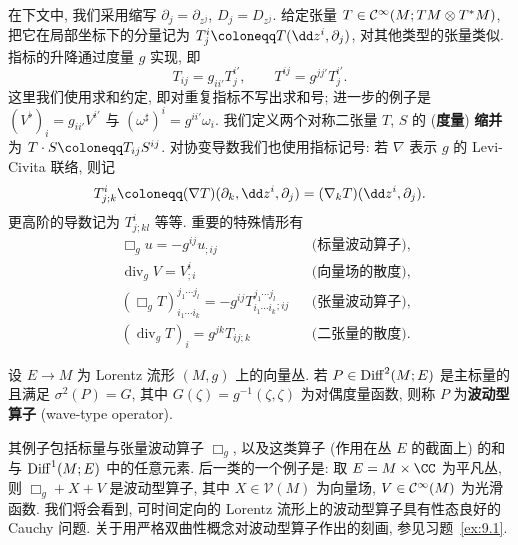 在下文中, 我们采用缩写 $\partial_j = \partial_{z^j}$, $D_j = D_{z^j}$. 给定张量 $T \in \mathcal{C}^\infty(M; TM \otimes T^* M)$, 把它在局部坐标下的分量记为 $T^i_j \defeq T(\dd z^i, \partial_j)$, 对其他类型的张量类似. 指标的升降通过度量 $g$ 实现, 即
\begin{equation}\label{eq:9.8}
    T_{ij} = g_{ii'} T^{i'}_j, \qquad T^{ij} = g^{jj'} T^{i'}_j.
\end{equation}
这里我们使用求和约定, 即对重复指标不写出求和号; 进一步的例子是 $(V^\flat)_i = g_{ii'} V^{i'}$ 与 $(\omega^\sharp)^i = g^{ii'} \omega_i$. 我们定义两个对称二张量 $T$, $S$ 的 (\textbf{度量}) \textbf{缩并}为 $T \cdot S \defeq T_{ij} S^{ij}$. 对协变导数我们也使用指标记号: 若 $\nabla$ 表示 $g$ 的 Levi-Civita 联络, 则记
\begin{equation}\label{eq:9.9}
    T^i_{j;k} \defeq (\nabla T)(\partial_k, \dd z^i, \partial_j) = (\nabla_k T)(\dd z^i, \partial_j).
\end{equation}
更高阶的导数记为 $T^i_{j;kl}$ 等等. 重要的特殊情形有
\begin{equation}\label{eq:9.10}
    \begin{aligned}
        &\Box_g u = -g^{ij} u_{;ij} && \text{(标量波动算子)}, \\
        &\operatorname{div}_g V = V^i_{;i} && \text{(向量场的散度)}, \\
        &(\Box_g T)_{i_1 \cdots i_k}^{j_1 \cdots j_l} = -g^{ij} T_{i_1 \cdots i_k}^{j_1 \cdots j_l}{}_{;ij} && \text{(张量波动算子)}, \\
        &(\operatorname{div}_g T)_i = g^{jk} T_{ij;k} && \text{(二张量的散度)}.
    \end{aligned}
\end{equation}

\begin{definition}[波动型算子]\label{def:9.8}
设 $E \to M$ 为 Lorentz 流形 $(M, g)$ 上的向量丛. 若 $P \in \operatorname{Diff}^2(M; E)$ 是主标量的且满足 $\sigma^2(P) = G$, 其中 $G(\zeta) = g^{-1}(\zeta, \zeta)$ 为对偶度量函数, 则称 $P$ 为\textbf{波动型算子} (wave-type operator).
\end{definition}

其例子包括标量与张量波动算子 $\Box_g$, 以及这类算子 (作用在丛 $E$ 的截面上) 的和与 $\operatorname{Diff}^1(M; E)$ 中的任意元素. 后一类的一个例子是: 取 $E = M \times \CC$ 为平凡丛, 则 $\Box_g + X + V$ 是波动型算子, 其中 $X \in \mathcal{V}(M)$ 为向量场, $V \in \mathcal{C}^\infty(M)$ 为光滑函数. 我们将会看到, 可时间定向的 Lorentz 流形上的波动型算子具有性态良好的 Cauchy 问题. 关于用严格双曲性概念对波动型算子作出的刻画, 参见习题~\ref{ex:9.1}.

